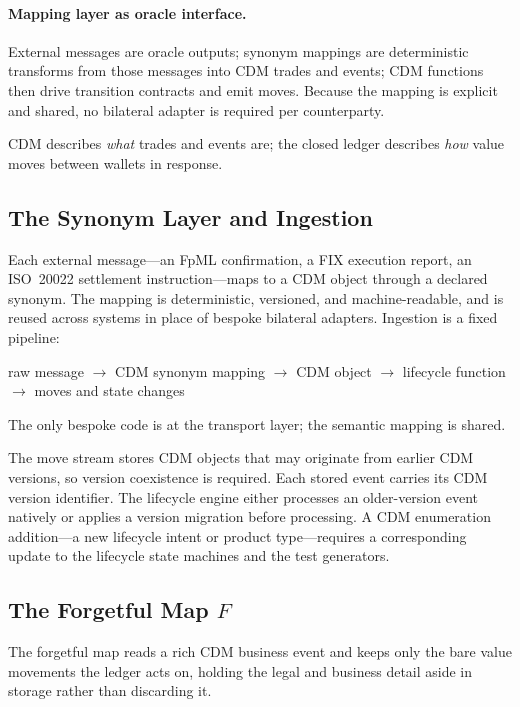 \documentclass[11pt,a4paper]{article}
\begin{document}
\paragraph{Mapping layer as oracle interface.} External messages are oracle outputs; synonym mappings are deterministic transforms from those messages into CDM trades and events; CDM functions then drive transition contracts and emit moves. Because the mapping is explicit and shared, no bilateral adapter is required per counterparty.

CDM describes \textit{what} trades and events are; the closed ledger describes \textit{how} value moves between wallets in response.

\subsection{The Synonym Layer and Ingestion}

Each external message---an FpML confirmation, a FIX execution report, an ISO~20022 settlement instruction---maps to a CDM object through a declared synonym. The mapping is deterministic, versioned, and machine-readable, and is reused across systems in place of bespoke bilateral adapters. Ingestion is a fixed pipeline:

\begin{center}
raw message $\to$ CDM synonym mapping $\to$ CDM object $\to$ lifecycle function $\to$ moves and state changes
\end{center}

The only bespoke code is at the transport layer; the semantic mapping is shared.

The move stream stores CDM objects that may originate from earlier CDM versions, so version coexistence is required. Each stored event carries its CDM version identifier. The lifecycle engine either processes an older-version event natively or applies a version migration before processing. A CDM enumeration addition---a new lifecycle intent or product type---requires a corresponding update to the lifecycle state machines and the test generators.

\subsection{The Forgetful Map \texorpdfstring{$F$}{F}}

The forgetful map reads a rich CDM business event and keeps only the bare value movements the ledger acts on, holding the legal and business detail aside in storage rather than discarding it.
\end{document}
